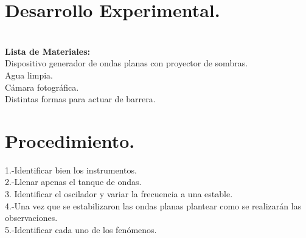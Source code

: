 \documentclass[10pt,a4paper]{article}
\begin{document}
\section*{Desarrollo Experimental.}\\
\textbf{Lista de Materiales:} \\
Dispositivo generador de ondas planas con proyector de sombras.\\
Agua limpia. \\
C\'{a}mara fotogr\'{a}fica.\\
Distintas formas para actuar de barrera. \\

\section*{Procedimiento.}
1.-Identificar bien los instrumentos. \\
2.-Llenar apenas el tanque de ondas.\\
3. Identificar el oscilador y variar la frecuencia a una estable. \\
4.-Una vez que se estabilizaron las ondas planas plantear como se realizar\'{a}n las observaciones.\\
5.-Identificar cada uno de los fen\'{o}menos.\\
\end{document}
